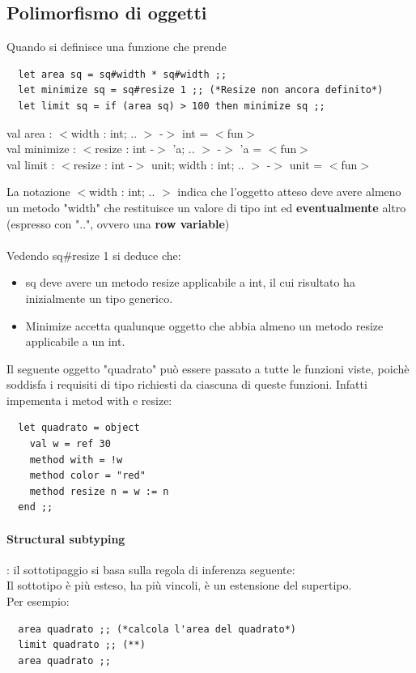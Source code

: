 \documentclass[12pt,a4paper]{article}
\begin{document}
\subsection{Polimorfismo di oggetti}
Quando si definisce una funzione che prende
\begin{lstlisting}
  let area sq = sq#width * sq#width ;;
  let minimize sq = sq#resize 1 ;; (*Resize non ancora definito*)
  let limit sq = if (area sq) > 100 then minimize sq ;;
\end{lstlisting}
\begin{center}
  val area : $<$width : int; .. $>$ -$>$ int = $<$fun$>$\\
  val minimize : $<$resize : int -$>$ 'a; .. $>$ -$>$ 'a = $<$fun$>$\\
  val limit : $<$resize : int -$>$ unit; width : int; .. $>$ -$>$ unit = $<$fun$>$
\end{center}
La notazione $<$width : int; .. $>$ indica che l'oggetto atteso deve avere almeno un metodo "width" che restituisce un valore di tipo int ed \textbf{eventualmente} altro (espresso con "..", ovvero una \textbf{row variable})\\\\
Vedendo sq\#resize 1 si deduce che:
\begin{itemize}
  \item sq deve avere un metodo resize applicabile a int, il cui risultato ha inizialmente un tipo generico.
  \item Minimize accetta qualunque oggetto che abbia almeno un metodo resize applicabile a un int.
\end{itemize}
Il seguente oggetto "quadrato" può essere passato a tutte le funzioni viste, poichè soddisfa i requisiti di tipo richiesti da ciascuna di queste funzioni. Infatti impementa i metod with e resize:
\begin{lstlisting}
  let quadrato = object
    val w = ref 30
    method with = !w
    method color = "red"
    method resize n = w := n
  end ;;
\end{lstlisting}
\paragraph{Structural subtyping}: il sottotipaggio si basa sulla regola di inferenza seguente:\\
Il sottotipo è più esteso, ha più vincoli, è un estensione del supertipo.\\
Per esempio:
\begin{lstlisting}
  area quadrato ;; (*calcola l'area del quadrato*) 
  limit quadrato ;; (**)
  area quadrato ;;
\end{lstlisting}
\end{document}
